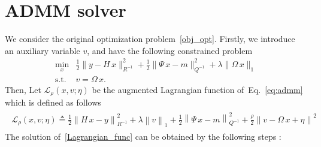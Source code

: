 \documentclass[11pt,a4paper]{article}
\begin{document}
\section{ADMM solver}
We consider the original optimization problem~\eqref{obj_opt}. Firstly, we introduce an auxiliary variable $v$, and have the following constrained problem  
\begin{equation}\label{eq:admm}
\begin{split}
\min_{x} &\frac{1}{2} \| y - H \, x \|^2_{R^{-1}}
   + \frac{1}{2} \| \Psi \, x - m \|^2_{Q^{-1}} 
   + \lambda \|\Omega\, x \|_1  \\
\mathrm{s.t.}\ & v = \Omega\,x . 
\end{split}
\end{equation}
Then, Let $\mathcal{L_\rho}(x,v;\eta)$ be the augmented Lagrangian function of~Eq.~\eqref{eq:admm} which is defined as follows
\begin{equation}\label{Lagrangian_func}
\begin{split}
\begin{aligned}
\mathcal{L_\rho}(x,v;\eta) \triangleq  \frac{1}{2}  \left \|  H\,x-y \right \|_{R^{-1}}^2 + \lambda\left \| v \right \|_1 
+ \frac{1}{2} \left \| \Psi \, x - m\right\|_{ Q^{-1} }^2    
+ \frac{\rho}{2}\left \| v- \Omega \,x + \eta \right \|^2
\end{aligned}
\end{split}
\end{equation}
The solution of~\eqref{Lagrangian_func} can be obtained by the following steps \cite{Boyd2011ADMM}:
\end{document}
